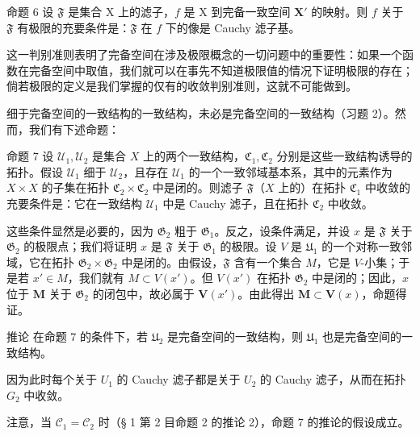 命题 6 设 \(\mathfrak{F}\) 是集合 X 上的滤子，\(f\) 是 X 到完备一致空间 \(\mathbf{X}'\) 的映射。则 \(f\) 关于 \(\mathfrak{F}\) 有极限的充要条件是：\(\mathfrak{F}\) 在 \(f\) 下的像是 Cauchy 滤子基。

这一判别准则表明了完备空间在涉及极限概念的一切问题中的重要性：如果一个函数在完备空间中取值，我们就可以在事先不知道极限值的情况下证明极限的存在；倘若极限的定义是我们掌握的仅有的收敛判别准则，这就不可能做到。

细于完备空间的一致结构的一致结构，未必是完备空间的一致结构（习题 2）。然而，我们有下述命题：

命题 7 设 \(\mathcal{U}_1, \mathcal{U}_2\) 是集合 \(X\) 上的两个一致结构，\(\mathfrak{C}_1, \mathfrak{C}_2\) 分别是这些一致结构诱导的拓扑。假设 \(\mathcal{U}_1\) 细于 \(\mathcal{U}_2\)，且存在 \(\mathcal{U}_1\) 的一个一致邻域基本系，其中的元素作为 \(X \times X\) 的子集在拓扑 \(\mathfrak{C}_2 \times \mathfrak{C}_2\) 中是闭的。则滤子 \(\mathfrak{F}\)（\(X\) 上的）在拓扑 \(\mathfrak{C}_1\) 中收敛的充要条件是：它在一致结构 \(\mathcal{U}_1\) 中是 Cauchy 滤子，且在拓扑 \(\mathfrak{C}_2\) 中收敛。

这些条件显然是必要的，因为 \(\mathfrak{G}_2\) 粗于 \(\mathfrak{G}_1\)。反之，设条件满足，并设 \(x\) 是 \(\mathfrak{F}\) 关于 \(\mathfrak{G}_2\) 的极限点；我们将证明 \(x\) 是 \(\mathfrak{F}\) 关于 \(\mathfrak{G}_1\) 的极限。设 \(V\) 是 \(\mathfrak{U}_1\) 的一个对称一致邻域，它在拓扑 \(\mathfrak{G}_2 \times \mathfrak{G}_2\) 中是闭的。由假设，\(\mathfrak{F}\) 含有一个集合 \(M\)，它是 \(V\)-小集；于是若 \(x' \in M\)，我们就有 \(M \subset V(x')\)。但 \(V(x')\) 在拓扑 \(\mathfrak{G}_{2}\) 中是闭的；因此，\(x\) 位于 \(\mathbf{M}\) 关于 \(\mathfrak{G}_{2}\) 的闭包中，故必属于 \(\mathbf{V}(x')\)。由此得出 \(\mathbf{M} \subset \mathbf{V}(x)\)，命题得证。

推论 在命题 7 的条件下，若 \(\mathfrak{U}_2\) 是完备空间的一致结构，则 \(\mathfrak{U}_1\) 也是完备空间的一致结构。

因为此时每个关于 \(U_{1}\) 的 Cauchy 滤子都是关于 \(U_{2}\) 的 Cauchy 滤子，从而在拓扑 \(G_{2}\) 中收敛。

注意，当 \(\mathcal{C}_1 = \mathcal{C}_2\) 时（§ 1 第 2 目命题 2 的推论 2），命题 7 的推论的假设成立。

